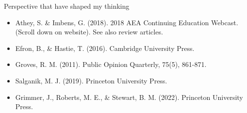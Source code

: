 \documentclass{beamer}
\newcommand\bref[2]{\href{#1}{\color{blue}{#2}}}
\begin{document}
\begin{frame}{Perspective that have shaped my thinking}
\small
\begin{itemize}
\item Athey, S. \& Imbens, G. (2018).  \bref{https://www.aeaweb.org/conference/cont-ed/2018-webcasts}{Machine Learning and Econometrics.} 2018 AEA Continuing Education Webcast. (Scroll down on website). See also review articles.
\item Efron, B., \& Hastie, T. (2016). \bref{https://hastie.su.domains/CASI/}{Computer age statistical inference: Algorithms, evidence, and data science.} Cambridge University Press.
\item Groves, R. M. (2011). \bref{https://doi.org/10.1093/poq/nfr057}{Three eras of survey research.} Public Opinion Quarterly, 75(5), 861-871.
\item Salganik, M. J. (2019). \bref{https://www.bitbybitbook.com/}{Bit by bit: Social research in the digital age.} Princeton University Press.
\item Grimmer, J., Roberts, M. E., \& Stewart, B. M. (2022). \bref{https://press.princeton.edu/books/hardcover/9780691207544/text-as-data}{Text as data: A new framework for machine learning and the social sciences.} Princeton University Press.
\end{itemize}

\end{frame}
\end{document}

